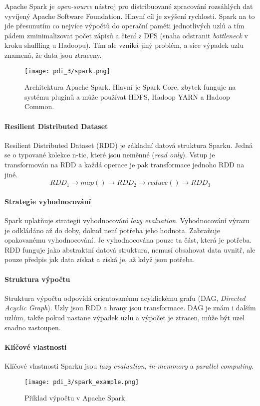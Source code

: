 Apache Spark je \textit{open-source} nástroj pro distribuované zpracování rozsáhlých dat vyvíjený Apache Software Foundation. Hlavní cíl je zvýšení rychlosti. Spark na to jde přesunutím co nejvíce výpočtů do operační paměti jednotlivých uzlů a tím pádem zminimalizovat počet zápisů a čtení z DFS (snaha odstranit \textit{bottleneck} v kroku shuffling u Hadoopu). Tím ale vzniká jiný problém, a sice výpadek uzlu znamená, že data jsou ztraceny.

\begin{figure}[H]
    \centering
    \texttt{[image: pdi\_3/spark.png]}
    \caption{Architektura Apache Spark. Hlavní je Spark Core, zbytek funguje na systému pluginů a může používat HDFS, Hadoop YARN a Hadoop Common.}
\end{figure}


\paragraph*{Resilient Distributed Dataset} Resilient Distributed Dataset (RDD) je základní datová struktura Sparku. Jedná se o typované kolekce n-tic, které jsou neměnné (\textit{read only}). Vstup je transformován na RDD a každá operace je pak transformace jednoho RDD na jiné.
$$
RDD_1 \rightarrow map() \rightarrow RDD_2 \rightarrow reduce() \rightarrow RDD_3
$$

\paragraph*{Strategie vyhodnocování} Spark uplatňuje strategii vyhodnocování \textit{lazy evaluation}. Vyhodnocování výrazu je odkládáno až do doby, dokud není potřeba jeho hodnota. Zabraňuje opakovanému vyhodnocování. Je vyhodnocována pouze ta část, která je potřeba. RDD funguje jako abstraktní datová struktura, nemusí obsahovat data uvnitř, ale pouze předpis jak data získat a získá je, až když jsou potřeba.

\paragraph*{Struktura výpočtu} Struktura výpočtu odpovídá orientovanému acyklickému grafu (DAG, \textit{Directed Acyclic Graph}). Uzly jsou RDD a hrany jsou transformace. DAG je znám i dalším uzlům, takže pokud nastane výpadek uzlu a výpočet je ztracen, může být uzel snadno zastoupen.

\paragraph*{Klíčové vlastnosti} Klíčové vlastnosti Sparku jsou \textit{lazy evaluation}, \textit{in-memmory} a \textit{parallel computing}.

\begin{figure}[H]
    \centering
    \texttt{[image: pdi\_3/spark\_example.png]}
    \caption{Příklad výpočtu v Apache Spark.}
\end{figure}
